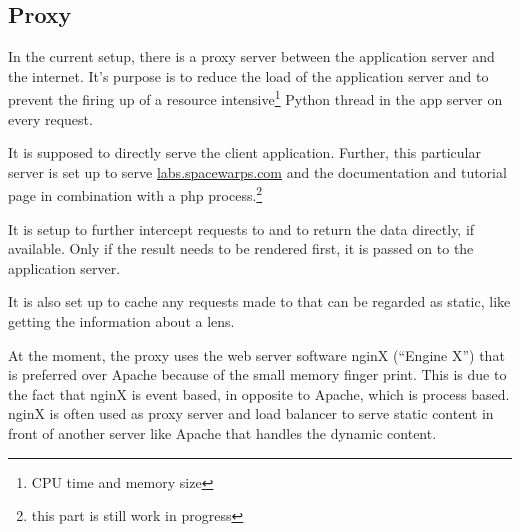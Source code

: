 \subsection{Proxy}
\label{sec:proxy}

In the current setup, there is a proxy server between the application server and the internet.
It's purpose is to reduce the load of the application server and to prevent the firing up of a resource intensive\footnote{CPU time and memory size} Python thread in the app server on every request.

It is supposed to directly serve the client application. Further, this particular server is set up to serve \url{labs.spacewarps.com} and the \spl documentation and tutorial page in combination with a php process.\footnote{this part is still work in progress}

It is setup to further intercept requests to  and to return the data directly, if available.
Only if the result needs to be rendered first, it is passed on to the application server.

It is also set up to cache any requests made to  that can be regarded as static, like getting the information about a lens.

At the moment, the proxy uses the web server software nginX (``Engine X'') that is preferred over Apache because of the small memory finger print.
This is due to the fact that nginX is event based, in opposite to Apache, which is process based.
nginX is often used as proxy server and load balancer to serve static content in front of another server like Apache that handles the dynamic content.



